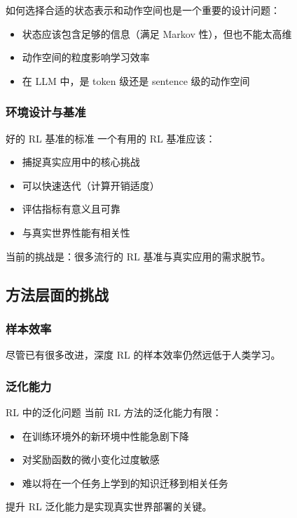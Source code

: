 如何选择合适的状态表示和动作空间也是一个重要的设计问题：
\begin{itemize}
    \item 状态应该包含足够的信息（满足 Markov 性），但也不能太高维
    \item 动作空间的粒度影响学习效率
    \item 在 LLM 中，是 token 级还是 sentence 级的动作空间
\end{itemize}

\subsubsection{环境设计与基准}

\begin{knowledgebox}{好的 RL 基准的标准}
一个有用的 RL 基准应该：
\begin{itemize}
    \item 捕捉真实应用中的核心挑战
    \item 可以快速迭代（计算开销适度）
    \item 评估指标有意义且可靠
    \item 与真实世界性能有相关性
\end{itemize}
当前的挑战是：很多流行的 RL 基准与真实应用的需求脱节。
\end{knowledgebox}

\subsection{方法层面的挑战}

\subsubsection{样本效率}

尽管已有很多改进，深度 RL 的样本效率仍然远低于人类学习。

\subsubsection{泛化能力}

\begin{importantbox}{RL 中的泛化问题}
当前 RL 方法的泛化能力有限：
\begin{itemize}
    \item 在训练环境外的新环境中性能急剧下降
    \item 对奖励函数的微小变化过度敏感
    \item 难以将在一个任务上学到的知识迁移到相关任务
\end{itemize}
提升 RL 泛化能力是实现真实世界部署的关键。
\end{importantbox}

